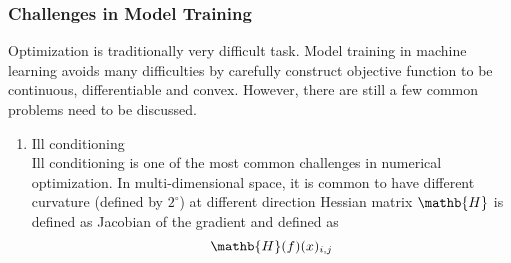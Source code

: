 \subsubsection{Challenges in Model Training}

Optimization is traditionally very difficult task. Model training in machine learning avoids many difficulties by carefully construct objective function to be continuous, differentiable and convex. However, there are still a few common problems need to be discussed. 

\begin{enumerate}
    \item Ill conditioning\\
Ill conditioning is one of the most common challenges in numerical optimization. In multi-dimensional space, it is common to have different curvature (defined by $2^\circ$) at different direction
Hessian matrix $\mathb{H}$ is defined as Jacobian of the gradient and defined as 
\begin{equation}
    \mathb{H}(f)(x)_{i,j}
\end{equation}
\end{enumerate}

